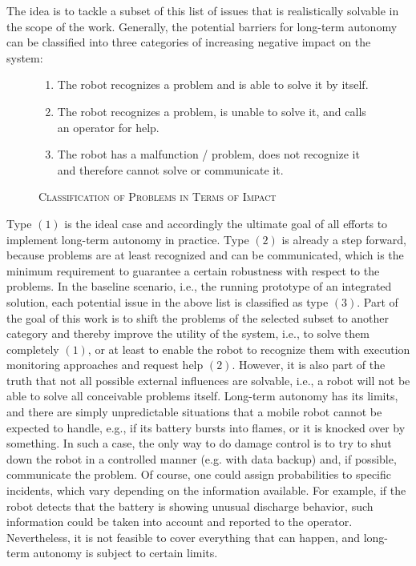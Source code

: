 \documentclass[english, master, utf8]{base/thesis_KBS}
\begin{document}
\noindent
The idea is to tackle a subset of this list of issues that is realistically solvable in the scope of the work.
Generally, the potential barriers for long-term autonomy can be classified into three categories of increasing negative impact on the system:
\begin{figure}[H]
\centering
\begin{enumerate}
    \item The robot recognizes a problem and is able to solve it by itself.
    \item The robot recognizes a problem, is unable to solve it, and calls an operator for help.
    \item The robot has a malfunction / problem, does not recognize it and therefore cannot solve or communicate it.
\end{enumerate}
\caption{\textsc{Classification of Problems in Terms of Impact}}
\label{fig:problem_types}
\end{figure}
Type $(1)$ is the ideal case and accordingly the ultimate goal of all efforts to implement long-term autonomy in practice. Type $(2)$ is already a step forward, because problems
are at least recognized and can be communicated, which is the minimum requirement to guarantee a certain robustness with respect to the problems.
In the baseline scenario, i.e., the running prototype of an integrated solution, each potential issue in the above list is classified as type $(3)$.
Part of the goal of this work is to shift the problems of the selected subset to another category and thereby improve the utility of the system, 
i.e., to solve them completely $(1)$, or at least to enable the robot to recognize them with execution monitoring approaches and request help $(2)$.
However, it is also part of the truth that not all possible external influences are solvable, i.e., a robot will not be able to solve all
conceivable problems itself. Long-term autonomy has its limits, and there are simply unpredictable situations that a mobile robot cannot be expected to handle,
e.g., if its battery bursts into flames, or it is knocked over by something. In such a case, the only way to do damage control is to try to shut down the 
robot in a controlled manner (e.g. with data backup) and, if possible, communicate the problem.
Of course, one could assign probabilities to specific incidents, which vary depending on the information available. 
For example, if the robot detects that the battery is showing unusual discharge behavior, such information could be taken into account and 
reported to the operator. Nevertheless, it is not feasible to cover everything that can happen, and long-term autonomy is subject to certain limits.
\end{document}

